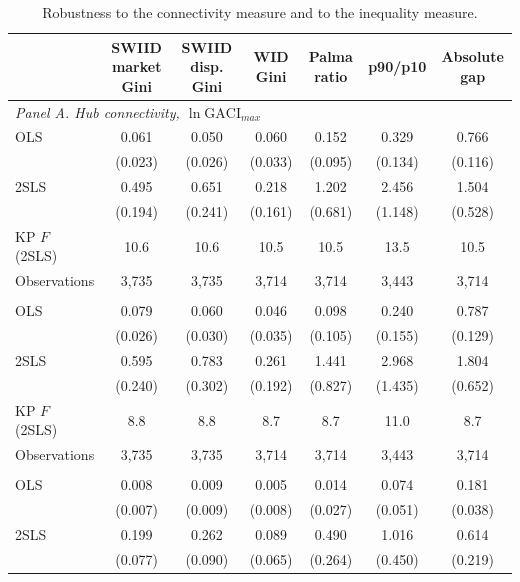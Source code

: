 \begin{table}[H]
\centering
\caption{Robustness to the connectivity measure and to the inequality measure.}
\label{tab:measures}
\begin{threeparttable}
\small
\begin{tabular}{lcccccc}
\toprule
 & SWIID market Gini & SWIID disp. Gini & WID Gini & Palma ratio & p90/p10 & Absolute gap \\
\midrule
\multicolumn{7}{l}{\emph{Panel A. Hub connectivity, $\ln\mathrm{GACI}_{max}$}}\\
OLS & 0.061\sym{***} & 0.050\sym{*} & 0.060\sym{*} & 0.152 & 0.329\sym{**} & 0.766\sym{***} \\
 & (0.023) & (0.026) & (0.033) & (0.095) & (0.134) & (0.116) \\
2SLS & 0.495\sym{**} & 0.651\sym{***} & 0.218 & 1.202\sym{*} & 2.456\sym{**} & 1.504\sym{***} \\
 & (0.194) & (0.241) & (0.161) & (0.681) & (1.148) & (0.528) \\
KP $F$ (2SLS) & 10.6 & 10.6 & 10.5 & 10.5 & 13.5 & 10.5 \\
Observations & 3{,}735 & 3{,}735 & 3{,}714 & 3{,}714 & 3{,}443 & 3{,}714 \\
\addlinespace
\multicolumn{7}{l}{\emph{Panel B. Hub quality, $\ln\mathrm{GACI}_{cwm}$}}\\
OLS & 0.079\sym{***} & 0.060\sym{**} & 0.046 & 0.098 & 0.240 & 0.787\sym{***} \\
 & (0.026) & (0.030) & (0.035) & (0.105) & (0.155) & (0.129) \\
2SLS & 0.595\sym{**} & 0.783\sym{***} & 0.261 & 1.441\sym{*} & 2.968\sym{**} & 1.804\sym{***} \\
 & (0.240) & (0.302) & (0.192) & (0.827) & (1.435) & (0.652) \\
KP $F$ (2SLS) & 8.8 & 8.8 & 8.7 & 8.7 & 11.0 & 8.7 \\
Observations & 3{,}735 & 3{,}735 & 3{,}714 & 3{,}714 & 3{,}443 & 3{,}714 \\
\addlinespace
\multicolumn{7}{l}{\emph{Panel C. Total connectivity, $\ln\mathrm{GACI}_{sum}$}}\\
OLS & 0.008 & 0.009 & 0.005 & 0.014 & 0.074 & 0.181\sym{***} \\
 & (0.007) & (0.009) & (0.008) & (0.027) & (0.051) & (0.038) \\
2SLS & 0.199\sym{***} & 0.262\sym{***} & 0.089 & 0.490\sym{*} & 1.016\sym{**} & 0.614\sym{***} \\
 & (0.077) & (0.090) & (0.065) & (0.264) & (0.450) & (0.219) \\

\end{tabular}
\end{threeparttable}
\end{table}
